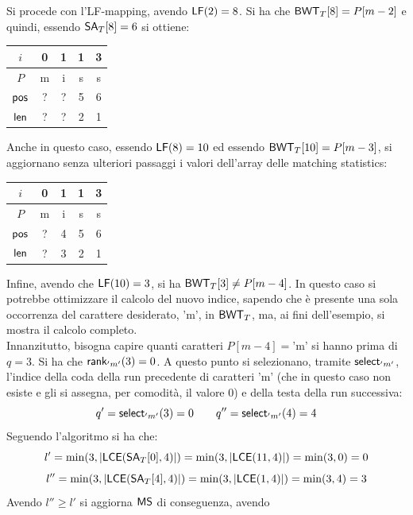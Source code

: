 \begin{esempio}
\begin{table}[H]
\begin{tabular}{c||c|c|c|c}
    \end{tabular}
  \end{table}
  Si procede con l'LF-mapping, avendo $\mbox{\rm {\sf LF}}(2)=8$. Si ha che
  $\mbox{\rm {\sf BWT}}_T[8]=P[m-2]$ e quindi, essendo $\mbox{\rm {\sf SA}}_T[8]=6$ si ottiene:
  \begin{table}[H]
    \centering
    \begin{tabular}{c||c|c|c|c}
      $i$ & 0 & 1 & 1 & 3 \\
      \hline
      $P$ & m & i & s & s \\
      \hline
      \hline
      $\mbox{\rm {\sf pos}}$ & ? & ? & 5 & 6\\
      \hline
      $\mbox{\rm {\sf len}}$& ? & ? & 2 & 1\\
    \end{tabular}
  \end{table}
  Anche in questo caso, essendo $\mbox{\rm {\sf LF}}(8)=10$ ed essendo $\mbox{\rm {\sf BWT}}_T[10]=P[m-3]$, si
  aggiornano senza ulteriori passaggi i valori dell'array delle matching
  statistics: 
  \begin{table}[H]
    \centering
    \begin{tabular}{c||c|c|c|c}
      $i$ & 0 & 1 & 1 & 3 \\
      \hline
      $P$ & m & i & s & s \\
      \hline
      \hline
      $\mbox{\rm {\sf pos}}$ & ? & 4 & 5 & 6\\
      \hline
      $\mbox{\rm {\sf len}}$ & ? & 3 & 2 & 1\\
    \end{tabular}
  \end{table}
  Infine, avendo che $\mbox{\rm {\sf LF}}(10)=3$, si ha $\mbox{\rm {\sf BWT}}_T[3]\neq P[m-4]$. In questo caso si
  potrebbe ottimizzare il calcolo del nuovo indice, sapendo che è presente una
  sola occorrenza del carattere desiderato, $\mbox{'m'}$, in $\mbox{\rm {\sf BWT}}_T$, ma, ai
  fini dell'esempio, si mostra il calcolo completo.\\
  Innanzitutto, bisogna capire
  quanti caratteri $P[m-4]=\mbox{'m'}$ si hanno prima di $q=3$. Si ha che
  $\mbox{\rm {\sf rank}}_{'m'}(3)=0$. A questo punto si selezionano, tramite $\mbox{\rm {\sf select}}_{'m'}$,
  l'indice della
  coda della run precedente di caratteri $\mbox{'m'}$ (che in questo caso non
  esiste e gli si assegna, per comodità, il valore 0) e della testa della run
  successiva:
  \[q'=\mbox{\rm {\sf select}}_{'m'}(3)=0\quad \quad q''=\mbox{\rm {\sf select}}_{'m'}(4)=4\]
  Seguendo l'algoritmo si ha che:
  \[l'=\min(3,\left|\mbox{\rm {\sf LCE}}(\mbox{\rm {\sf SA}}_T[0],4)\right|)=\min(3,\left|\mbox{\rm {\sf LCE}}(11,4)\right|)
    =\min(3,0)=0\]
  \[l''=\min(3,\left|\mbox{\rm {\sf LCE}}(\mbox{\rm {\sf SA}}_T[4],4)\right|)=\min(3,\left|\mbox{\rm {\sf LCE}}(1,4)\right|)
    =\min(3,4)=3\]
  Avendo $l''\geq l'$ si aggiorna $\mbox{\rm {\sf MS}}$ di conseguenza, avendo

\end{esempio}
